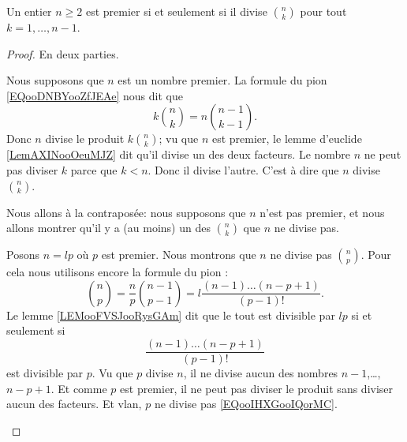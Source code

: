 \begin{proposition}	\label{PROPooVPOYooNNugWU}
	Un entier \( n\geq 2\) est premier si et seulement si il divise \( \binom{ n }{ k }\) pour tout \( k=1,\ldots,n-1\).
\end{proposition}

\begin{proof}
	En deux parties.
	\begin{subproof}
		\spitem[\( \Rightarrow\)]
		Nous supposons que \( n\) est un nombre premier. La formule du pion \eqref{EQooDNBYooZfJEAe} nous dit que
		\begin{equation}
			k\binom{ n }{ k }=n\binom{ n-1 }{ k-1 }.
		\end{equation}
		Donc \( n\) divise le produit \(k\binom{ n }{ k }\); vu que \( n\) est premier, le lemme d'euclide \ref{LemAXINooOeuMJZ} dit qu'il divise un des deux facteurs. Le nombre \( n\) ne peut pas diviser \( k\) parce que \( k<n\). Donc il divise l'autre. C'est à dire que \( n\) divise \( \binom{ n }{ k }\).

		\spitem[\( \Leftarrow\)]
		Nous allons à la contraposée: nous supposons que \( n\) n'est pas premier, et nous allons montrer qu'il y a (au moins) un des \( \binom{ n }{ k }\) que \( n\) ne divise pas.

		Posons \( n=lp\) où \( p\) est premier. Nous montrons que \( n\) ne divise pas \( \binom{ n }{ p }\). Pour cela nous utilisons encore la formule du pion :
		\begin{equation}
			\binom{ n }{ p }=\frac{ n }{ p }\binom{ n-1 }{ p-1 }=l\frac{ (n-1)\ldots (n-p+1) }{ (p-1)! }.
		\end{equation}
		Le lemme \ref{LEMooFVSJooRysGAm} dit que le tout est divisible par \( lp\) si et seulement si
		\begin{equation}		\label{EQooIHXGooIQorMC}
			\frac{ (n-1)\ldots (n-p+1) }{ (p-1)! }
		\end{equation}
		est divisible par \( p\). Vu que \( p\) divise \( n\), il ne divise aucun des nombres \( n-1\),\ldots,\( n-p+1\). Et comme \( p\) est premier, il ne peut pas diviser le produit sans diviser aucun des facteurs. Et vlan, \( p\) ne divise pas \eqref{EQooIHXGooIQorMC}.
	\end{subproof}
\end{proof}

